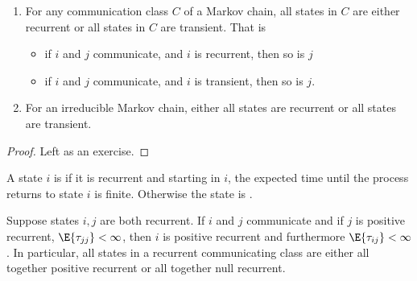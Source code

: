 \documentclass[12pt]{article}
\begin{document}
\begin{enumerate}
\begin{corollary}
    \label{cor:stationarydistributions:allrecurrent}
    \begin{enumerate}
        \item
            For any communication class \( C \) of a Markov chain, all
            states in \( C \) are either recurrent or all states in \( C
            \) are transient.  That is
            \begin{itemize}
                \item
                    if \( i \) and \( j \) communicate, and \( i \) is
                    recurrent, then so is \( j \)
                \item
                    if \( i \) and \( j \) communicate, and \( i \) is
                    transient, then so is \( j \).
            \end{itemize}
        \item
            For an irreducible Markov chain, either all states are
            recurrent or all states are transient.
    \end{enumerate}
\end{corollary}

\begin{proof}
    Left as an exercise.
\end{proof}

\begin{definition}
    A state \( i \) is  if it is recurrent and
    starting in \( i \), the expected time until the process returns to
    state \( i \) is finite.  Otherwise the state is .
\end{definition}

\begin{proposition}
    Suppose states \( i,j \) are both recurrent.  If \( i \) and \( j \)
    communicate and if \( j \) is positive recurrent, \( \E{\tau_{jj}} <
    \infty \), then \( i \) is positive recurrent and furthermore \( \E{\tau_
    {ij}} < \infty \).  In particular, all states in a recurrent
    communicating class are either all together positive recurrent or
    all together null recurrent.
\end{proposition}


\end{enumerate}
\end{document}

